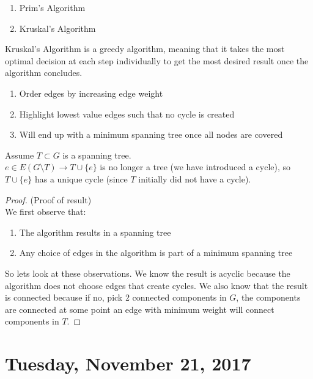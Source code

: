 \documentclass[12pt]{article}
\begin{document}
\begin{enumerate}
	\item{Prim's Algorithm}
	\item{Kruskal's Algorithm}
\end{enumerate}

\begin{tcolorbox}[title=Kruskal's Algorithm]
	Kruskal's Algorithm is a greedy algorithm, meaning that it takes the most optimal decision at each step individually to get the most desired result once the algorithm concludes.
	\begin{enumerate}
		\item{Order edges by increasing edge weight}
		\item{Highlight lowest value edges such that no cycle is created}
		\item{Will end up with a minimum spanning tree once all nodes are covered}
	\end{enumerate}
\end{tcolorbox}

Assume $T \subset G$ is a spanning tree.\\
$e \in E(G \setminus T) \longrightarrow T \cup \{ e \}$ is no longer a tree (we have introduced a cycle), so $T \cup \{ e \}$ has a unique cycle (since $T$ initially did not have a cycle).

\begin{proof}
	(Proof of result)\\
	We first observe that:\\
	\begin{enumerate}
		\item{The algorithm results in a spanning tree}
		\item{Any choice of edges in the algorithm is part of a minimum spanning tree}
	\end{enumerate}
So lets look at these observations. We know the result is acyclic because the algorithm does not choose edges that create cycles. We also know that the result is connected because if no, pick 2 connected components in $G$, the components are connected at some point an edge with minimum weight will connect components in $T$.
\end{proof}

\newpage

\section{Tuesday, November 21, 2017}
\end{document}
